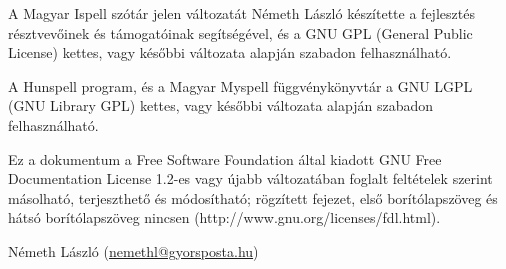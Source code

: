 A Magyar Ispell szótár jelen változatát Németh László készítette
a fejlesztés résztvevőinek és támogatóinak segítségével,
és a GNU GPL (General Public License) kettes, vagy későbbi változata
alapján szabadon felhasználható.

A Hunspell program, és a Magyar Myspell függvénykönyvtár
a GNU LGPL (GNU Library GPL) kettes, vagy későbbi változata
alapján szabadon felhasználható.

Ez a dokumentum a Free Software Foundation által kiadott GNU Free
Documentation License 1.2-es vagy újabb változatában foglalt feltételek
szerint másolható, terjeszthető és módosítható; rögzített
fejezet, első borítólapszöveg és hátsó borítólapszöveg nincsen
(http://www.gnu.org/licenses/fdl.html).

Németh László (\url{nemethl@gyorsposta.hu})

